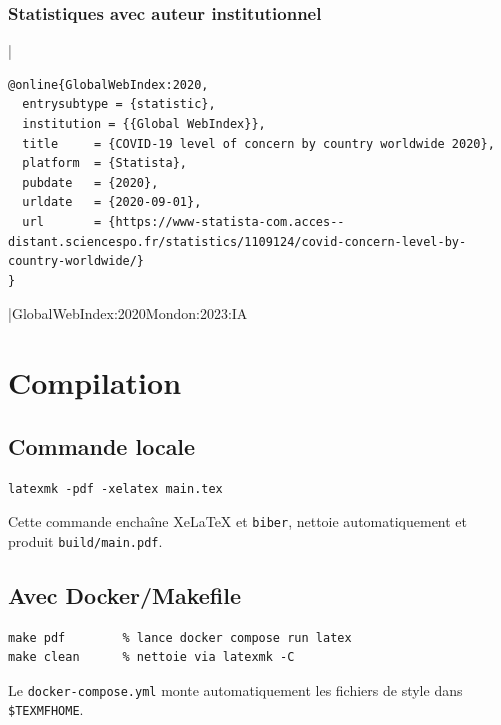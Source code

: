 \documentclass{article}
\begin{document}
\subsubsection{Statistiques avec auteur institutionnel}

|
\begin{verbatim}
@online{GlobalWebIndex:2020,
  entrysubtype = {statistic},
  institution = {{Global WebIndex}},
  title     = {COVID-19 level of concern by country worldwide 2020},
  platform  = {Statista},
  pubdate   = {2020},
  urldate   = {2020-09-01},
  url       = {https://www-statista-com.acces--distant.sciencespo.fr/statistics/1109124/covid-concern-level-by-country-worldwide/}
}
\end{verbatim}
|{GlobalWebIndex:2020}{Mondon:2023:IA}

\section{Compilation}

\subsection{Commande locale}
\begin{verbatim}
latexmk -pdf -xelatex main.tex
\end{verbatim}
Cette commande enchaîne XeLaTeX et \texttt{biber}, nettoie automatiquement et produit \texttt{build/main.pdf}.

\subsection{Avec Docker/Makefile}
\begin{verbatim}
make pdf        % lance docker compose run latex
make clean      % nettoie via latexmk -C
\end{verbatim}
Le \texttt{docker-compose.yml} monte automatiquement les fichiers de style dans \texttt{\$TEXMFHOME}.

\newpage
\ifdefined\demobib
  \nocite{*}
\fi
\printbibliography[heading=bibintoc, title=Bibliographie]
\end{document}
